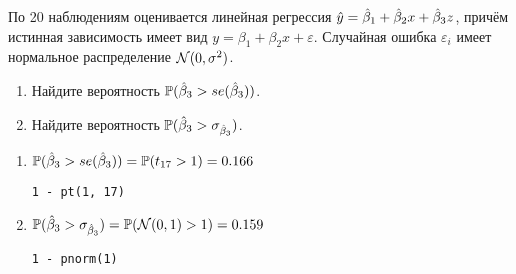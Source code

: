 \begin{problem} %
По 20 наблюдениям оценивается линейная регрессия $\hat{y}=\hat{\beta}_1 +\hat{\beta}_2 x+\hat{\beta}_3 z$, причём истинная зависимость имеет вид $y=\beta_1 +\beta_2 x+\varepsilon$. Случайная ошибка $\varepsilon_i$ имеет нормальное распределение $\mathcal{N}(0,\sigma^2)$.

\begin{enumerate}
\item Найдите вероятность $\mathbb{P}(\hat{\beta}_3>se(\hat{\beta}_3))$.
\item Найдите вероятность $\mathbb{P}(\hat{\beta}_3>\sigma_{\hat{\beta}_3})$.
\end{enumerate}


\begin{sol}

\begin{enumerate}
\item $\mathbb{P}(\hat{\beta}_3>se(\hat{\beta}_3))=\mathbb{P}(t_{17}>1)=0.166$
\begin{verbatim}
1 - pt(1, 17)
\end{verbatim}

\item $\mathbb{P}(\hat{\beta}_3>\sigma_{\hat{\beta}_3})=\mathbb{P}(\mathcal{N}(0,1)>1)=0.159$
\begin{verbatim}
1 - pnorm(1)
\end{verbatim}
\end{enumerate}
\end{sol}
\end{problem}



